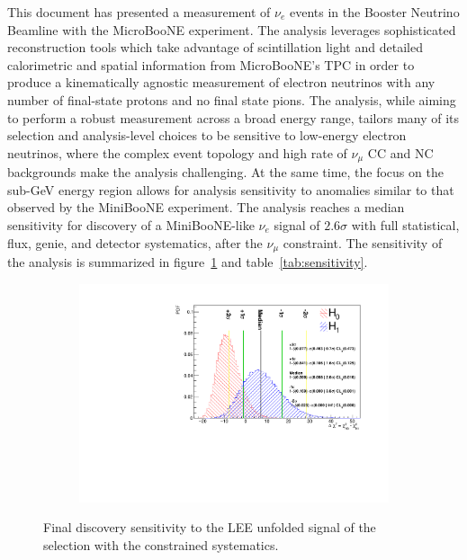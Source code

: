 \label{sec:conclusions}
\par This document has presented a measurement of $\nu_e$ events in the Booster Neutrino Beamline with the MicroBooNE experiment. The analysis leverages sophisticated reconstruction tools which take advantage of scintillation light and detailed calorimetric and spatial information from MicroBooNE's TPC in order to produce a kinematically agnostic measurement of electron neutrinos with any number of final-state protons and no final state pions. The analysis, while aiming to perform a robust measurement across a broad energy range, tailors many of its selection and analysis-level choices to be sensitive to low-energy electron neutrinos, where the complex event topology and high rate of $\nu_{\mu}$ CC and NC backgrounds make the analysis challenging. At the same time, the focus on the sub-GeV energy region allows for analysis sensitivity to anomalies similar to that observed by the MiniBooNE experiment. The analysis reaches a median sensitivity for discovery of a MiniBooNE-like $\nu_e$ signal of $2.6\sigma$ with full statistical, flux, genie, and detector systematics, after the $\nu_{\mu}$ constraint. The sensitivity of the analysis is summarized in figure~\ref{fig:sensitivity_bdt_loose_const:conclusions} and table~\ref{tab:sensitivity}.

\begin{figure}[H]
    \begin{center}
    \begin{subfigure}{0.55\textwidth}
    \includegraphics[width=1.00\textwidth]{Sensitivity/BDT_higheff/SBNfit_Cls_nue_1e0p_numu_reco_e_H1_newBDT_higheff_noCCMEC_constrained_detsys.pdf}
    \end{subfigure}
    \caption{\label{fig:sensitivity_bdt_loose_const:conclusions}Final discovery sensitivity to the LEE unfolded signal of the \npsel selection with the constrained systematics.}
    \end{center}
\end{figure}

